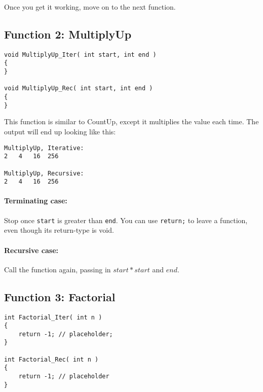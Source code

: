 Once you get it working, move on to the next function.

\newpage

\subsection{Function 2: MultiplyUp}

\begin{lstlisting}[style=code]
void MultiplyUp_Iter( int start, int end )
{
}

void MultiplyUp_Rec( int start, int end )
{
}
\end{lstlisting}

This function is similar to CountUp, except it multiplies the value each time.
The output will end up looking like this:

\begin{lstlisting}[style=output]
MultiplyUp, Iterative:
2	4	16	256	

MultiplyUp, Recursive:
2	4	16	256	
\end{lstlisting}

\paragraph{Terminating case:}
    Stop once \texttt{start} is greater than \texttt{end}. You can use
    \texttt{return;} to leave a function, even though its return-type is void.

\paragraph{Recursive case:}
    Call the function again, passing in $start * start$ and $end$.


\newpage

\subsection{Function 3: Factorial}

\begin{lstlisting}[style=code]
int Factorial_Iter( int n )
{
    return -1; // placeholder;
}

int Factorial_Rec( int n )
{
    return -1; // placeholder
}
\end{lstlisting}

